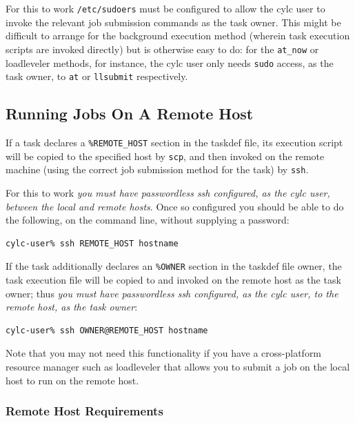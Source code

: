 \documentclass[11pt,a4paper]{article}
\begin{document}
For this to work \lstinline=/etc/sudoers= must be configured to allow
the cylc user to invoke the relevant job submission commands as the task
owner.  This might be difficult to arrange for the background execution
method (wherein task execution scripts are invoked directly) but is
otherwise easy to do: for the \lstinline=at_now= or loadleveler methods,
for instance, the cylc user only needs \lstinline=sudo= access, as the
task owner, to \lstinline=at= or \lstinline=llsubmit= respectively.

\subsection{Running Jobs On A Remote Host}
\label{RunningJobsOnARemoteHost}

If a task declares a \lstinline=%REMOTE_HOST= section in the taskdef
file, its execution script will be copied to the specified host by 
\lstinline=scp=, and then invoked on the remote machine (using the
correct job submission method for the task) by \lstinline=ssh=. 

For this to work {\em you must have passwordless ssh configured, as 
the cylc user, between the local and remote hosts}. Once so configured
you should be able to do the following, on the command line, without
supplying a password:

\begin{lstlisting}
cylc-user% ssh REMOTE_HOST hostname
\end{lstlisting}

If the task additionally declares an \lstinline=%OWNER= section in the
taskdef file owner, the task execution file will be copied to and
invoked on the remote host as the task owner; thus {\em you must have
passwordless ssh configured, as the cylc user, to the remote host, as
the task owner}:

\begin{lstlisting}
cylc-user% ssh OWNER@REMOTE_HOST hostname
\end{lstlisting}

Note that you may not need this functionality if you have a
cross-platform resource manager such as loadleveler that allows 
you to submit a job on the local host to run on the remote host.

\subsubsection{Remote Host Requirements}
\end{document}

